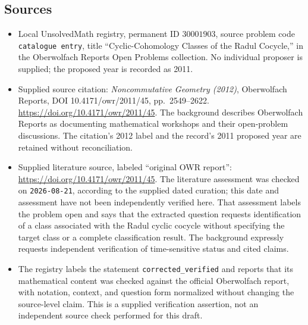 \documentclass[11pt]{article}
\begin{document}
\subsection{Sources}
\begin{itemize}
\item Local UnsolvedMath registry, permanent ID \(30001903\), source problem code \texttt{catalogue entry}, title ``Cyclic-Cohomology Classes of the Radul Cocycle,'' in the Oberwolfach Reports Open Problems collection. No individual proposer is supplied; the proposed year is recorded as 2011.
\item Supplied source citation: \emph{Noncommutative Geometry (2012)}, Oberwolfach Reports, DOI 10.4171/owr/2011/45, pp.\ 2549--2622. \url{https://doi.org/10.4171/owr/2011/45}. The background describes Oberwolfach Reports as documenting mathematical workshops and their open-problem discussions. The citation's 2012 label and the record's 2011 proposed year are retained without reconciliation.
\item Supplied literature source, labeled ``original OWR report'': \url{https://doi.org/10.4171/owr/2011/45}. The literature assessment was checked on \texttt{2026-08-21}, according to the supplied dated curation; this date and assessment have not been independently verified here. That assessment labels the problem open and says that the extracted question requests identification of a class associated with the Radul cyclic cocycle without specifying the target class or a complete classification result. The background expressly requests independent verification of time-sensitive status and cited claims.
\item The registry labels the statement \texttt{corrected\_verified} and reports that its mathematical content was checked against the official Oberwolfach report, with notation, context, and question form normalized without changing the source-level claim. This is a supplied verification assertion, not an independent source check performed for this draft.
\end{itemize}
\end{document}
